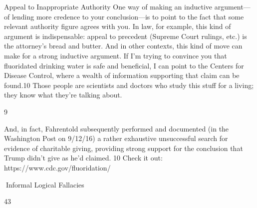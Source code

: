 Appeal to Inappropriate Authority
One way of making an inductive argument—of lending more credence to your conclusion—is to
point to the fact that some relevant authority figure agrees with you. In law, for example, this kind
of argument is indispensable: appeal to precedent (Supreme Court rulings, etc.) is the attorney’s
bread and butter. And in other contexts, this kind of move can make for a strong inductive
argument. If I’m trying to convince you that fluoridated drinking water is safe and beneficial, I can
point to the Centers for Disease Control, where a wealth of information supporting that claim can
be found.10 Those people are scientists and doctors who study this stuff for a living; they know
what they’re talking about.

9

And, in fact, Fahrentold subsequently performed and documented (in the Washington Post on 9/12/16) a rather
exhaustive unsuccessful search for evidence of charitable giving, providing strong support for the conclusion that
Trump didn’t give as he’d claimed.
10
Check it out: https://www.cdc.gov/fluoridation/

Informal Logical Fallacies

43

